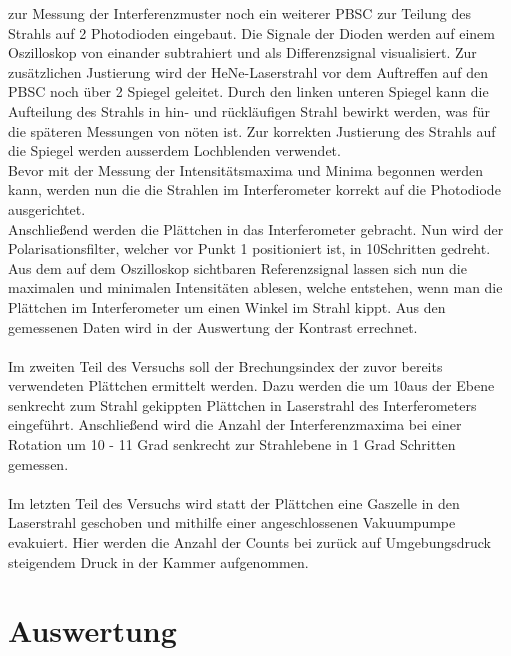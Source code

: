   zur Messung der Interferenzmuster noch ein weiterer PBSC zur Teilung des Strahls auf 2 Photodioden eingebaut. Die Signale der Dioden werden auf einem Oszilloskop von einander subtrahiert und
  als Differenzsignal visualisiert.
  Zur zusätzlichen Justierung wird der HeNe-Laserstrahl vor dem Auftreffen auf den PBSC noch über 2 Spiegel geleitet. Durch den linken unteren Spiegel kann die Aufteilung des Strahls in hin- und rückläufigen
  Strahl bewirkt werden, was für die späteren Messungen von nöten ist. Zur korrekten Justierung des Strahls auf die Spiegel werden ausserdem Lochblenden verwendet.\\
  Bevor mit der Messung der Intensitätsmaxima und Minima begonnen werden kann, werden nun die die Strahlen im Interferometer korrekt auf die Photodiode
  ausgerichtet.\\
  Anschließend werden die Plättchen in das Interferometer gebracht. Nun wird der Polarisationsfilter, welcher vor Punkt 1 positioniert ist,
  in 10\circ Schritten gedreht. Aus dem auf dem Oszilloskop sichtbaren Referenzsignal lassen sich nun die maximalen und minimalen Intensitäten ablesen, welche entstehen, wenn
  man die Plättchen im Interferometer um einen Winkel im Strahl kippt. Aus den gemessenen Daten wird in der Auswertung der Kontrast errechnet.\\
  \\
  Im zweiten Teil des Versuchs soll der Brechungsindex der zuvor bereits verwendeten Plättchen ermittelt werden. Dazu werden die um 10\circ aus der Ebene senkrecht zum Strahl gekippten Plättchen in Laserstrahl des Interferometers eingeführt.
  Anschließend wird die Anzahl der Interferenzmaxima bei einer Rotation um 10 - 11 Grad senkrecht zur Strahlebene in 1 Grad Schritten gemessen.\\
  \\
  Im letzten Teil des Versuchs wird statt der Plättchen eine Gaszelle in den Laserstrahl geschoben und mithilfe einer angeschlossenen Vakuumpumpe evakuiert.
  Hier werden die Anzahl der Counts bei zurück auf Umgebungsdruck steigendem Druck in der Kammer aufgenommen.
\section{Auswertung}
